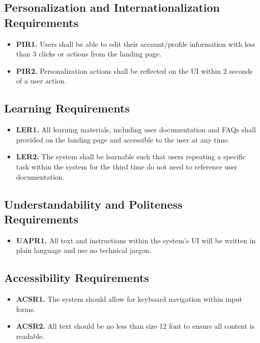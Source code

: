 \documentclass[12pt]{article}
\begin{document}
\subsection{Personalization and Internationalization Requirements}

\begin{itemize}
    \item \textbf{PIR1.} Users shall be able to edit their account/profile information with less than 3 clicks or actions from the landing page.
    \item \textbf{PIR2.} Personalization actions shall be reflected on the UI within 2 seconds of a user action.
\end{itemize}

\subsection{Learning Requirements}

\begin{itemize}
    \item \textbf{LER1.} All learning materials, including user documentation and FAQs shall provided on the landing page and accessible to the user at any time.
    \item \textbf{LER2.} The system shall be learnable such that users repeating a specific task within the system for the third time do not need to reference user documentation.
\end{itemize}

\subsection{Understandability and Politeness Requirements}

\begin{itemize}
    \item \textbf{UAPR1.} All text and instructions within the system's UI will be written in plain language and use no technical jargon.
\end{itemize}

\subsection{Accessibility Requirements}
\begin{itemize}
    \item \textbf{ACSR1.} The system should allow for keyboard navigation within input forms.
    \item \textbf{ACSR2.} All text should be no less than size 12 font to ensure all content is readable.
\end{itemize}
\end{document}
